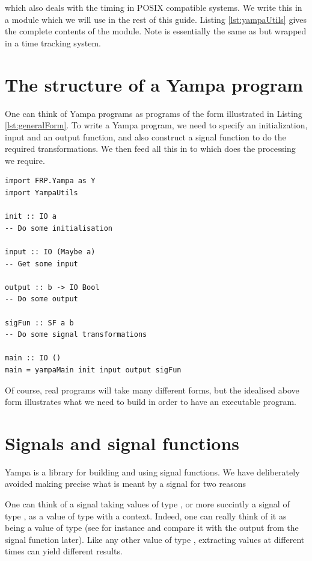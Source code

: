 \noindent which also deals with the timing in POSIX compatible systems. We write this in a module  which we will use in the rest of this guide. Listing \ref{lst:yampaUtils} gives the complete contents of the module. Note \yampaMain is essentially the same as  but wrapped in a time tracking system.



\section{The structure of a Yampa program}

One can think of Yampa programs as programs of the form illustrated in Listing \ref{lst:generalForm}. To write a Yampa program, we need to specify an initialization, input and an output function, and also construct a signal function to do the required transformations. We then feed all this in to \yampaMain which does the processing we require.

\begin{lstlisting}[caption={General form of a Yampa program}, label={lst:generalForm}]
import FRP.Yampa as Y
import YampaUtils

init :: IO a
-- Do some initialisation

input :: IO (Maybe a)
-- Get some input

output :: b -> IO Bool
-- Do some output

sigFun :: SF a b
-- Do some signal transformations

main :: IO ()
main = yampaMain init input output sigFun
\end{lstlisting}

Of course, real programs will take many different forms, but the idealised above form illustrates what we need to build in order to have an executable program.

\section{Signals and signal functions}

Yampa is a library for building and using signal functions. We have deliberately avoided making precise what is meant by a signal for two reasons

One can think of a signal taking values of type , or more succintly a signal of type , as a value of type  with a context. Indeed, one can really think of it as being a value of type  (see for instance  and compare it with the output from the  signal function later). Like any other value of type , extracting values at different times can yield different results.
